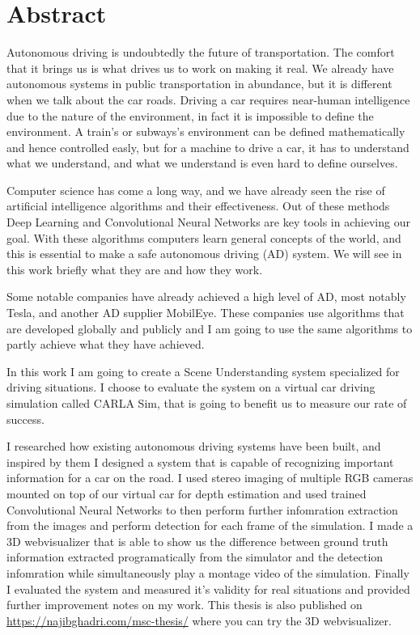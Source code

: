 \setcounter{page}{1}

\selectenglish


\chapter*{Abstract}

Autonomous driving is undoubtedly the future of transportation. The comfort that
it brings us is what drives us to work on making it real. We already have
autonomous systems in public transportation in abundance, but it is different
when we talk about the car roads. Driving a car requires near-human intelligence
due to the nature of the environment, in fact it is impossible to define the
environment. A train's or subways's environment can be defined mathematically
and hence controlled easly, but for a machine to drive a car, it has to
understand what we understand, and what we understand is even hard to define
ourselves.

Computer science has come a long way, and we have already seen the rise of
artificial intelligence algorithms and their effectiveness. Out of these methods
Deep Learning and Convolutional Neural Networks are key tools in achieving our
goal. With these algorithms computers learn general concepts of the world, and
this is essential to make a safe autonomous driving (AD) system. We will see in
this work briefly what they are and how they work. 

Some notable companies have already achieved a high level of AD, most notably
Tesla, and another AD supplier MobilEye. These companies use algorithms that are
developed globally and publicly and I am going to use the same algorithms to
partly achieve what they have achieved. 

In this work I am going to create a Scene Understanding system specialized for
driving situations. I choose to evaluate the system on a virtual car driving
simulation called CARLA Sim, that is going to benefit us to measure our rate of
success.

I researched how existing autonomous driving systems have been built, and
inspired by them I designed a system that is capable of recognizing important
information for a car on the road. I used stereo imaging of multiple RGB cameras
mounted on top of our virtual car for depth estimation and used trained
Convolutional Neural Networks to then perform further infomration extraction
from the images and perform detection for each frame of the simulation. I made a
3D webvisualizer that is able to show us the difference between ground truth
information extracted programatically from the simulator and the detection
infomration while simultaneously play a montage video of the simulation. Finally
I evaluated the system and measured it's validity for real situations and
provided further improvement notes on my work. This thesis is also published on
\url{https://najibghadri.com/msc-thesis/} where you can try the 3D
webvisualizer.

\vfill
\selectthesislanguage

\setcounter{romanPage}{\value{page}}
